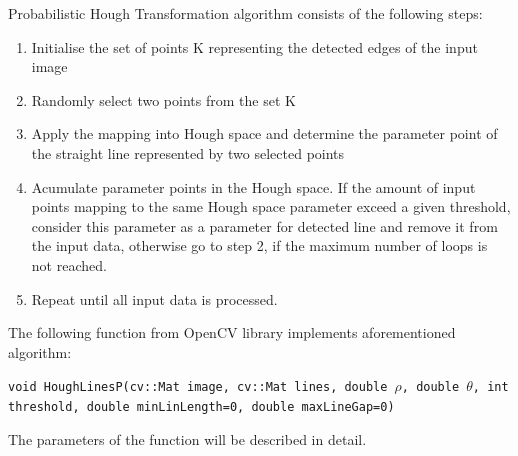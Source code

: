Probabilistic Hough Transformation algorithm consists of the following steps:

\begin{enumerate}

\item Initialise the set of points K representing the detected edges of the input image
\item  Randomly select two points from the set K  
\item  Apply the mapping into Hough space and determine the parameter point of the straight line represented by two selected points
\item  Acumulate parameter points in the Hough space. If  the amount of input points mapping to the same Hough space parameter exceed a given threshold, consider this parameter as a parameter for detected line and remove it from the input data, otherwise go to step 2, if the maximum number of loops is not reached.
\item  Repeat until all input data is processed.
\end{enumerate}

The following function from OpenCV library implements aforementioned algorithm:

  \begin{center}
  
\texttt{void HoughLinesP(cv::Mat image, cv::Mat lines, double $\rho$, double $\theta$, int threshold,  double minLinLength=0,  double maxLineGap=0)  }

  \end{center}

The parameters of the function will be described in detail.\cite{Standard_Hough_Transformation2}
 
